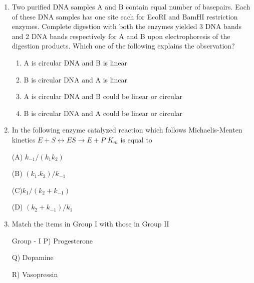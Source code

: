 \documentclass[journal]{IEEEtran}
\begin{document}
\begin{enumerate}
\begin{minipage}{0.5\textwidth}
\begin{flushleft}
2) Phagocytosis

3) Albumin

4) Macroglobulin

5) Fc receptors for IgE

6) Plasma cells
		\end{flushleft}
		\end{minipage}
(A) P-5, Q-1, R-6, S-2

(C) P-3, Q-4, R-5. S-1

(B) P-1, Q-2, R-3, S-4

(D) P-2, Q-6, R-1, S-3

\item {Two purified DNA samples A and B contain equal number of basepairs. Each of these DNA samples has one site each for EcoRI and BamHI restriction enzymes. Complete digestion with both the enzymes yielded 3 DNA bands and 2 DNA bands respectively for A and B upon electrophoresis of the digestion products. Which one of the following explains the observation?}
	\begin{enumerate}
		\item{ A is circular DNA and B is linear}

		\item{ B is circular DNA and A is lincar}

		\item{ A is circular DNA and B could be linear or circular}

		\item{ B is circular DNA and A could be linear or circular}
	\end{enumerate}
\item {In the following enzyme catalyzed reaction which follows Michaelis-Menten kinetics	
	\newline\textbf{ $E + S \leftrightarrow ES \rightarrow E + P$}}
	$K_m$ is equal to

(A) $k_{-1}/(k_1k_2)$

(B) $(k_1. k_2)/k_{-1}$

(C)$ k_1/(k_2+k_{-1})$

(D) $(k_2+k_{-1})/k_1$

\item {Match the items in Group I with those in Group II}
	\newline
\begin{minipage}{0.5\textwidth}
\begin{flushleft}
	Group - I
P) Progesterone

Q) Dopamine

R) Vasopressin


\end{flushleft}
\end{minipage}
\end{enumerate}
\end{document}
